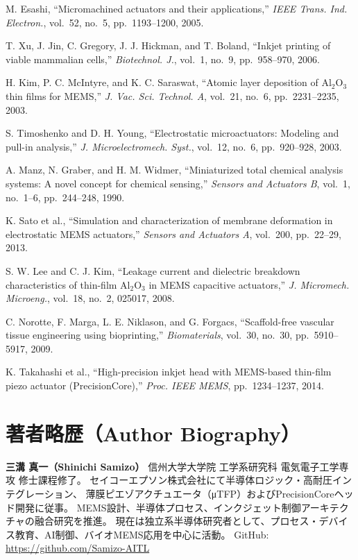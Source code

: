 \documentclass[conference]{IEEEtran}
\begin{document}
\balance

\begin{thebibliography}{99}

M. Esashi, ``Micromachined actuators and their applications,'' 
\emph{IEEE Trans. Ind. Electron.}, vol.~52, no.~5, pp.~1193–1200, 2005.

T. Xu, J. Jin, C. Gregory, J. J. Hickman, and T. Boland, 
``Inkjet printing of viable mammalian cells,'' 
\emph{Biotechnol. J.}, vol.~1, no.~9, pp.~958–970, 2006.

H. Kim, P. C. McIntyre, and K. C. Saraswat, 
``Atomic layer deposition of Al$_2$O$_3$ thin films for MEMS,'' 
\emph{J. Vac. Sci. Technol. A}, vol.~21, no.~6, pp.~2231–2235, 2003.

S. Timoshenko and D. H. Young, 
``Electrostatic microactuators: Modeling and pull-in analysis,'' 
\emph{J. Microelectromech. Syst.}, vol.~12, no.~6, pp.~920–928, 2003.

A. Manz, N. Graber, and H. M. Widmer, 
``Miniaturized total chemical analysis systems: A novel concept for chemical sensing,'' 
\emph{Sensors and Actuators B}, vol.~1, no.~1–6, pp.~244–248, 1990.

K. Sato et al., 
``Simulation and characterization of membrane deformation in electrostatic MEMS actuators,'' 
\emph{Sensors and Actuators A}, vol.~200, pp.~22–29, 2013.

S. W. Lee and C. J. Kim, 
``Leakage current and dielectric breakdown characteristics of thin-film Al$_2$O$_3$ in MEMS capacitive actuators,'' 
\emph{J. Micromech. Microeng.}, vol.~18, no.~2, 025017, 2008.

C. Norotte, F. Marga, L. E. Niklason, and G. Forgacs, 
``Scaffold-free vascular tissue engineering using bioprinting,'' 
\emph{Biomaterials}, vol.~30, no.~30, pp.~5910–5917, 2009.

K. Takahashi et al., 
``High-precision inkjet head with MEMS-based thin-film piezo actuator (PrecisionCore),'' 
\emph{Proc. IEEE MEMS}, pp.~1234–1237, 2014.

\end{thebibliography}

\section*{著者略歴（Author Biography）}
\textbf{三溝 真一（Shinichi Samizo）}  
信州大学大学院 工学系研究科 電気電子工学専攻 修士課程修了。  
セイコーエプソン株式会社にて半導体ロジック・高耐圧インテグレーション、
薄膜ピエゾアクチュエータ（μTFP）およびPrecisionCoreヘッド開発に従事。  
MEMS設計、半導体プロセス、インクジェット制御アーキテクチャの融合研究を推進。  
現在は独立系半導体研究者として、プロセス・デバイス教育、AI制御、バイオMEMS応用を中心に活動。  
GitHub: \url{https://github.com/Samizo-AITL}
\end{document}
